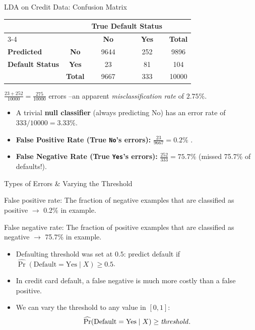 \documentclass[aspectratio=169, 11pt]{beamer}
\begin{document}
\begin{frame}{LDA on Credit Data: Confusion Matrix}
  \begin{table}
    \centering
    \begin{tabular}{l c c c c}
      \toprule
      & & \multicolumn{2}{c}{\textbf{True Default Status}} & \\
      \cmidrule(lr){3-4}
      & & \textbf{No} & \textbf{Yes} & \textbf{Total} \\
      \midrule
      \textbf{Predicted} & \textbf{No}  & 9644 & 252 & 9896 \\
      \textbf{Default Status} & \textbf{Yes} & 23   & 81  & 104  \\
      \midrule
      & \textbf{Total} & 9667 & 333 & 10000 \\
      \bottomrule
    \end{tabular}
  \end{table}
  \vspace{0.2cm}
  $\frac{23 + 252}{10000} = \frac{275}{10000}$ errors --an apparent \textit{misclassification rate} of $2.75\%$.
  \pause
  \begin{itemize}
    \item A trivial \textbf{null classifier} (always predicting No) has an error rate of $333/10000 = 3.33\%$.
    \item \textbf{False Positive Rate (True \texttt{No}'s errors):} $\frac{23}{9667} = 0.2\%$ .
    \item \textbf{False Negative Rate (True \texttt{Yes}'s errors):} $\frac{252}{333} = 75.7\%$ (missed 75.7\% of defaults!).
  \end{itemize}
\end{frame}

\begin{frame}{Types of Errors \& Varying the Threshold}
  \begin{block}{False positive rate:} The fraction of negative examples that are classified as positive $\longrightarrow$ 0.2\% in example.
  \end{block}
  \begin{block}{False negative rate:} The fraction of positive examples that are
classified as negative $\longrightarrow$ 75.7\% in example.
  \end{block}
  \pause
  \begin{itemize}
    \item Defaulting threshold was set at $0.5$: predict default if $\widehat{\Pr}(\text{Default} = \text{Yes} \mid X) \ge 0.5$.
    \item In credit card default, a false negative is much more costly than a false positive.
    \item We can vary the threshold to any value in $[0, 1]$:
    \[
      \widehat{\Pr}(\text{Default} = \text{Yes} \mid X) \ge \text{\textit{threshold}}.
    \]
  \end{itemize}
\end{frame}
\end{document}
